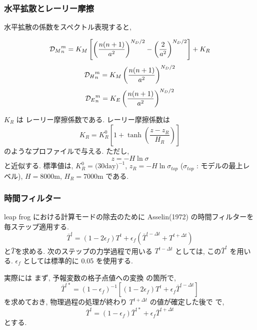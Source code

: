 \subsubsection{水平拡散とレーリー摩擦}

水平拡散の係数をスペクトル表現すると,

\begin{equation}
 {{\cal D}_M}_n^m = K_M 
                      \left[ \left( \frac{n(n+1)}{a^2} \right)^{N_D/2} 
                                - \left( \frac{2}{a^2} \right)^{N_D/2} 
                      \right]
                  + K_R
\end{equation}
%
\begin{equation}
  {{\cal D}_H}_n^m = K_M \left( \frac{n(n+1)}{a^2} \right)^{N_D/2} 
\end{equation}
%
\begin{equation}
  {{\cal D}_E}_n^m = K_E \left( \frac{n(n+1)}{a^2} \right)^{N_D/2} 
\end{equation}

$K_R$ は レーリー摩擦係数である.
レーリー摩擦係数は
\begin{equation}
  K_R = K_R^0 \left[ 1+\tanh \left( \frac{z-z_R}{H_R} \right) \right]
\end{equation}
のようなプロファイルで与える.
ただし,
\begin{equation}
  z = - H \ln \sigma 
\end{equation}
と近似する.
標準値は, $K_R^0 = \mbox{(30day)}^{-1}$,
$z_R = -H \ln \sigma_{top}$ ($\sigma_{top}$ : モデルの最上レベル),
$H = 8000$m,
$H_R = 7000$m である.

\subsubsection{時間フィルター}


leap frog における計算モードの除去のために 
Asselin(1972) の時間フィルターを毎ステップ適用する.
%
\begin{equation}
  \bar{T}^{t}
    = ( 1-2 \epsilon_f ) T^{t}
    +  \epsilon_f 
        \left( \bar{T}^{t-\Delta t} + T^{t+\Delta t} \right)
\end{equation}
%
と$\bar{T}$を求める.
次のステップの力学過程で用いる $T^{t-\Delta t}$ としては,
この$\bar{T}^t$ を用いる.
$\epsilon_f$ としては標準的に 0.05 を使用する. 

実際には
まず, 予報変数の格子点値への変換  の箇所で,
\begin{equation}
  \bar{T}^{t*}
    = ( 1 -\epsilon_f )^{-1} 
     \left[ ( 1-2 \epsilon_f ) T^{t} + \epsilon_f \bar{T}^{t-\Delta t}
     \right]
\end{equation}
を求めておき, 物理過程の処理が終わり
$T^{t+\Delta t}$ の値が確定した後で  で,
\begin{equation}
 \bar{T}^{t}
    = ( 1 -\epsilon_f ) \bar{T}^{t*}  
       +  \epsilon_f \bar{T}^{t+\Delta t}
\end{equation}
とする.
